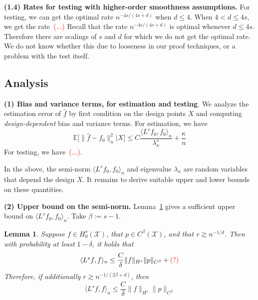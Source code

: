 \documentclass{article}
\newcommand{\1}{\mathbf{1}}
\newcommand{\mc}[1]{\mathcal{#1}}
\newcommand{\Ebb}{\mathbb{E}}
\newcommand{\dotp}[2]{\langle #1, #2 \rangle}
\newcommand{\wh}[1]{\widehat{#1}}
\theoremstyle{alden}
\theoremstyle{aldenthm}
\newtheorem{lemma}{Lemma}
\theoremstyle{definition}
\theoremstyle{remark}
\begin{document}
\textbf{(1.4) Rates for testing with higher-order smoothness assumptions.} For testing, we can get the optimal rate $n^{-4s/(4s + d)}$ when $d \leq 4$. When $4 < d \leq 4s$, we get the rate~\textcolor{red}{(...)} Recall that the rate $n^{-4s/(4s + d)}$ is optimal whenever $d \leq 4s$. Therefore there are scalings of $s$ and $d$ for which we do not get the optimal rate. We do not know whether this due to looseness in our proof techniques, or a problem with the test itself.

\subsection{Analysis}
\label{sec:analysis}

\textbf{(1) Bias and variance terms, for estimation and testing}. We analyze the estimation error of $\wh{f}$ by first condition on the design points $X$ and computing \emph{design-dependent} bias and variance terms. For estimation, we have
\begin{equation*}
\Ebb\bigl[\|\wh{f} - f_0\|_n^2|X\bigr] \leq C\frac{\dotp{L^s f_0}{f_0}_n}{\lambda_{\kappa}^s} + \frac{\kappa}{n}
\end{equation*}
For testing, we have~\textcolor{red}{(...)}.

In the above, the semi-norm $\dotp{L^s f_0}{f_0}_n$ and eigenvalue $\lambda_{\kappa}$ are random variables that depend the design $X$. It remains to derive suitable upper and lower bounds on these quantities. 

\textbf{(2) Upper bound on the semi-norm. } Lemma~\ref{lem:graph_seminorm} gives a sufficient upper bound on $\dotp{L^s f_0}{f_0}_n$. Take $\beta := s - 1$. 
\begin{lemma}
	\label{lem:graph_seminorm} 
	Suppose $f \in H_0^s(\mc{X})$, that $p \in C^{\beta}(\mc{X})$, and that $r \gtrsim n^{-1/d}$. Then with probability at least $1 - \delta$, it holds that 
	\begin{equation}
	\label{eqn:graph_seminorm_1}
	\dotp{L^s f}{f}_n \leq \frac{C}{\delta} \|f\|_{H^s} \|p\|_{C^{\beta}} + \textcolor{red}{(?)}
	\end{equation}
	Therefore, if additionally $r \gtrsim n^{-1/(2\beta + d)}$, then 
	\begin{equation}
	\label{eqn:graph_seminorm_2}
	\dotp{L^s f}{f}_n \leq \frac{C}{\delta} \|f\|_{H^s} \|p\|_{C^{\beta}}
	\end{equation}
\end{lemma}
\end{document}
